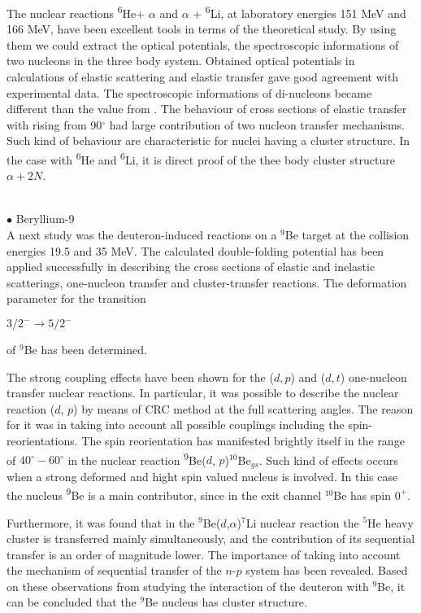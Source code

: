 \documentclass[
12pt, %
oneside, %
english, %
onehalfspacing, %
onehalfspacing, %
headsepline, %
]{MastersDoctoralThesis} %
\newcommand{\he}{\textsuperscript{6}He\xspace}
\newcommand{\li}{\textsuperscript{6}Li\xspace}
\newcommand{\be}{\textsuperscript{9}Be\xspace}
\begin{document}
The nuclear reactions \he + $\alpha$ and $\alpha$ + \li, at laboratory energies 151 MeV and 166 MeV, have been excellent tools in terms of the theoretical study. 
By using them we could extract the optical potentials, the spectroscopic informations of two nucleons in the three body system. 
Obtained optical potentials in calculations of elastic scattering and elastic transfer gave good agreement with experimental data.
 The spectroscopic informations of di-nucleons became different than the value from \cite{khoa2004di, oganessian1999dynamics}.
  The behaviour of cross sections of elastic transfer with rising from 90$^\circ$ had large contribution of two nucleon transfer mechanisms.
   Such kind of behaviour are characteristic for nuclei having a cluster structure. 
   In the case with \he  and \li, it is direct proof of the thee body cluster structure $\alpha+2N$.

~\\
$\bullet$ Beryllium-9 \\
A next study was  the deuteron-induced reactions on a ${}^9$Be target at the collision energies 19.5 and 35 MeV.
The calculated double-folding potential has been applied successfully in describing the cross sections of elastic and inelastic scatterings, one-nucleon  transfer and cluster-transfer reactions.
  The deformation parameter for the transition \begin{small}
  $3/2^-\rightarrow5/2^-$
\end{small}  of ${}^9$Be has been determined.

 The strong coupling effects have been shown for the ($d,p$) and ($d,t$) one-nucleon transfer nuclear reactions. 
In particular, it was possible to describe the nuclear reaction ($d$, $p$) by means of CRC method at the full scattering angles. The reason for it was in taking into account all possible couplings including the spin-reorientations. The spin reorientation has manifested brightly itself in the range of $40^\circ-60^\circ$ in the nuclear reaction \be($d$, $p$)${}^{10}$Be$_{gs}$. Such kind of effects occurs when a strong deformed and hight spin valued nucleus is involved. In this case the nucleus \be is a main contributor, since in the exit channel $^{10}$Be has spin $0^+$.

 Furthermore, it was found that  in the ${}^9$Be($d$,$\alpha$)${}^7$Li nuclear reaction the ${}^5$He heavy cluster  is transferred mainly simultaneously, and the contribution of its sequential transfer is an order of magnitude lower.
 The importance of taking into account the mechanism of sequential transfer of the $n$-$p$ system has been revealed.
 Based on these observations from studying the interaction of the  deuteron with  $^9$Be, it can be concluded that the $^9$Be  nucleus has cluster structure.
 
\end{document}
